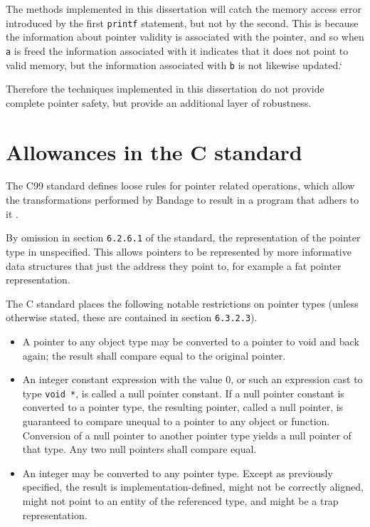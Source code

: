 The methods implemented in this dissertation will catch the memory access error introduced by the first \verb!printf! statement, but not by the second.
This is because the information about pointer validity is associated with the pointer, and so when \verb!a! is freed the information associated with it indicates that it does not point to valid memory, but the information associated with \verb!b! is not likewise updated.`

Therefore the techniques implemented in this dissertation do not provide complete pointer safety, but provide an additional layer of robustness.

\section{Allowances in the C standard}

The C99 standard defines loose rules for pointer related operations, which allow the transformations performed by Bandage to result in a program that adhers to it \cite{c99all}.

By omission in section \verb!6.2.6.1! of the standard, the representation of the pointer type in unspecified.
This allows pointers to be represented by more informative data structures that just the address they point to, for example a fat pointer representation.

The C standard places the following notable restrictions on pointer types (unless otherwise stated, these are contained in section \verb!6.3.2.3!).

\begin{itemize}
\item A pointer to any object type may be converted to a pointer to void and back again; the result shall compare equal to the original pointer.
\item An integer constant expression with the value 0, or such an expression cast to type \verb!void *!, is called a null pointer constant.  
If a null pointer constant is converted to a pointer type, the resulting pointer, called a null pointer, is guaranteed to compare unequal to a pointer to any object or function.
Conversion of a null pointer to another pointer type yields a null pointer of that type.  
Any two null pointers shall compare equal.
\item An integer may be converted to any pointer type.
Except as previously specified, the result is implementation-defined, might not be correctly aligned, might not point to an entity of the referenced type, and might be a trap representation.
\end{itemize}

